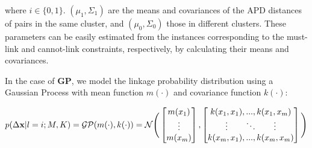 where $i \in \{0,1\}$. $(\mu_1, \Sigma_1)$ are the means and covariances of the APD distances of pairs in the same cluster, and $(\mu_0, \Sigma_0)$ those in different clusters. These parameters can be easily estimated from the instances corresponding to the must-link and cannot-link constraints, respectively, by calculating their means and covariances. 





In the case of \textbf{GP}, we model the linkage probability distribution using a Gaussian Process with mean function $m(\cdot)$ and covariance function $k(\cdot)$:  


\begin{equation}
\label{eq:gp}
p(\Delta \textbf x | l=i; M, K) = \mathcal{GP}(m(\cdot), k(\cdot)) = \mathcal{N}\Bigg( \begin{bmatrix}m(x_1) \\ \vdots \\ m(x_m) \end{bmatrix},  \begin{bmatrix}k(x_1, x_1), ..., k(x_1, x_m) \\ \vdots \quad \quad \ddots \quad \quad \vdots \\ k(x_m, x_1), ..., k(x_m, x_m)\end{bmatrix}  \Bigg)
\end{equation}

